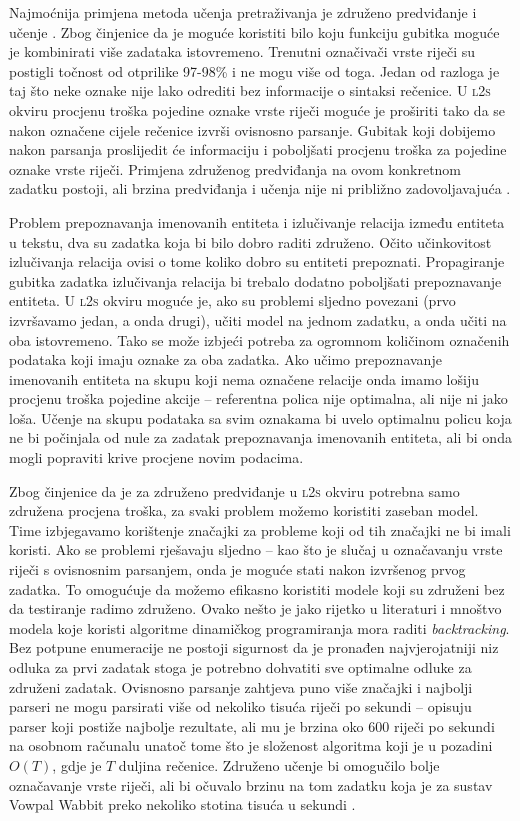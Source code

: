 Najmoćnija primjena metoda učenja pretraživanja je združeno predviđanje i učenje
. Zbog činjenice da je moguće koristiti bilo
koju funkciju gubitka moguće je kombinirati više zadataka istovremeno. Trenutni
označivači vrste riječi su postigli točnost od otprilike 97-98\%
\citep{manning2011part} i ne mogu više od toga. Jedan od razloga je taj što neke
oznake nije lako odrediti bez informacije o sintaksi rečenice. U \textsc{l2s}
okviru procjenu troška pojedine oznake vrste riječi moguće je proširiti tako da
se nakon označene cijele rečenice izvrši ovisnosno parsanje. Gubitak koji
dobijemo nakon parsanja proslijedit će informaciju i poboljšati procjenu troška
za pojedine oznake vrste riječi. Primjena združenog predviđanja na ovom
konkretnom zadatku postoji, ali brzina predviđanja i učenja nije ni približno
zadovoljavajuća \citep{bohnet2012transition}.

Problem prepoznavanja imenovanih entiteta i izlučivanje relacija između entiteta
u tekstu, dva su zadatka koja bi bilo dobro raditi združeno. Očito učinkovitost
izlučivanja relacija ovisi o tome koliko dobro su entiteti prepoznati.
Propagiranje gubitka zadatka izlučivanja relacija bi trebalo dodatno poboljšati
prepoznavanje entiteta. U \textsc{l2s} okviru moguće je, ako su problemi sljedno
povezani (prvo izvršavamo jedan, a onda drugi), učiti model na jednom zadatku, a
onda učiti na oba istovremeno. Tako se može izbjeći potreba za ogromnom
količinom označenih podataka koji imaju oznake za oba zadatka. Ako učimo
prepoznavanje imenovanih entiteta na skupu koji nema označene relacije onda
imamo lošiju procjenu troška pojedine akcije -- referentna polica nije
optimalna, ali nije ni jako loša. Učenje na skupu podataka sa svim oznakama bi
uvelo optimalnu policu koja ne bi počinjala od nule za zadatak prepoznavanja
imenovanih entiteta, ali bi onda mogli popraviti krive procjene novim podacima.

Zbog činjenice da je za združeno predviđanje u \textsc{l2s} okviru potrebna samo
združena procjena troška, za svaki problem možemo koristiti zaseban model. Time
izbjegavamo korištenje značajki za probleme koji od tih značajki ne bi imali
koristi. Ako se problemi rješavaju sljedno -- kao što je slučaj u označavanju
vrste riječi s ovisnosnim parsanjem, onda je moguće stati nakon izvršenog prvog
zadatka. To omogućuje da možemo efikasno koristiti modele koji su združeni bez
da testiranje radimo združeno. Ovako nešto je jako rijetko u literaturi i
mnoštvo modela koje koristi algoritme dinamičkog programiranja mora raditi
\textit{backtracking}. Bez potpune enumeracije ne postoji sigurnost da je
pronađen najvjerojatniji niz odluka za prvi zadatak stoga je potrebno dohvatiti
sve optimalne odluke za združeni zadatak. Ovisnosno parsanje zahtjeva puno više
značajki i najbolji parseri ne mogu parsirati više od nekoliko tisuća riječi po
sekundi -- \citet{andor2016globally} opisuju parser koji postiže najbolje
rezultate, ali mu je brzina oko 600 riječi po sekundi na osobnom računalu unatoč
tome što je složenost algoritma koji je u pozadini $O(T)$, gdje je $T$ duljina
rečenice. Združeno učenje bi omogučilo bolje označavanje vrste riječi, ali bi
očuvalo brzinu na tom zadatku koja je za sustav Vowpal Wabbit preko nekoliko
stotina tisuća u sekundi \citep{daume14lts}.
